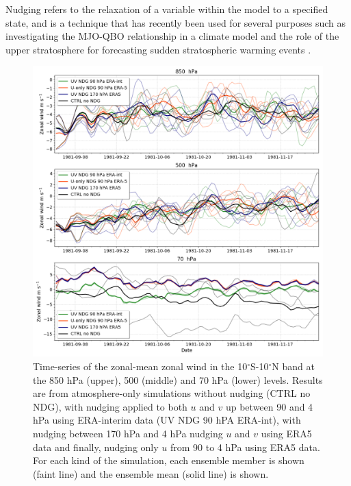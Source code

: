 Nudging refers to the relaxation of a variable within the model to a specified state, and is a technique that has recently been used for several purposes such as investigating the MJO-QBO relationship in a climate model \citep{martin2021} and the role of the upper stratosphere for forecasting sudden stratospheric warming events \citep{gray2020}.

\begin{figure}[t!]
\centering
 \includegraphics[width=0.95\linewidth]{figures/u_test__.png}
\caption[Time-series of zonal-mean winds under different nudging conditions]{Time-series of the zonal-mean zonal wind in the 10$^\circ$S-10$^\circ$N band at the 850 hPa (upper), 500 (middle) and 70 hPa (lower) levels. Results are from atmosphere-only simulations without nudging (CTRL no NDG), with nudging applied to both $u$ and $v$ up between 90 and 4 hPa using ERA-interim data (UV NDG 90 hPA ERA-int), with nudging between 170 hPa and 4 hPa nudging $u$ and $v$ using ERA5 data and finally, nudging only $u$ from 90 to 4 hPa using ERA5 data. For each kind of the simulation, each ensemble member is shown (faint line) and the ensemble mean (solid line) is shown. }
\label{fig:u_nudg_stv}
\end{figure}

